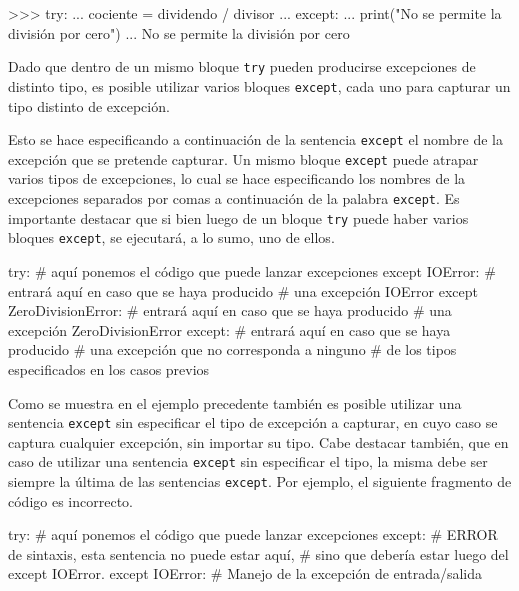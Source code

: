 \begin{codigo-python-sn}
>>> try:
...     cociente = dividendo / divisor
... except:
...     print("No se permite la división por cero")
...
No se permite la división por cero
\end{codigo-python-sn}

Dado que dentro de un mismo bloque \lstinline!try! pueden producirse
excepciones de distinto tipo, es posible utilizar varios bloques
\lstinline!except!, cada uno para capturar un tipo distinto de excepción.

Esto se hace especificando a continuación de la sentencia
\lstinline!except! el nombre de la excepción que se pretende capturar. Un
mismo bloque \lstinline!except! puede atrapar varios tipos de excepciones,
lo cual se hace especificando los nombres de la excepciones separados por
comas a continuación de la palabra \lstinline!except!. Es importante
destacar que si bien luego de un bloque \lstinline!try! puede haber varios
bloques \lstinline!except!, se ejecutará, a lo sumo, uno de ellos.

\begin{codigo-python-sn}
try:
    # aquí ponemos el código que puede lanzar excepciones
except IOError:
    # entrará aquí en caso que se haya producido
    # una excepción IOError
except ZeroDivisionError:
    # entrará aquí en caso que se haya producido
    # una excepción ZeroDivisionError
except:
    # entrará aquí en caso que se haya producido
    # una excepción que no corresponda a ninguno
    # de los tipos especificados en los casos previos
\end{codigo-python-sn}

Como se muestra en el ejemplo precedente también es posible utilizar una
sentencia \lstinline!except! sin especificar el tipo de excepción a
capturar, en cuyo caso se captura cualquier excepción, sin importar su
tipo. Cabe destacar también, que en caso de utilizar una sentencia
\lstinline!except! sin especificar el tipo, la misma debe ser siempre la
última de las sentencias \lstinline!except!. Por ejemplo, el siguiente
fragmento de código es incorrecto.

\begin{codigo-python-sn}[numbers=none]
try:
    # aquí ponemos el código que puede lanzar excepciones
except:
    # ERROR de sintaxis, esta sentencia no puede estar aquí,
    # sino que debería estar luego del except IOError.
except IOError:
    # Manejo de la excepción de entrada/salida
\end{codigo-python-sn}

